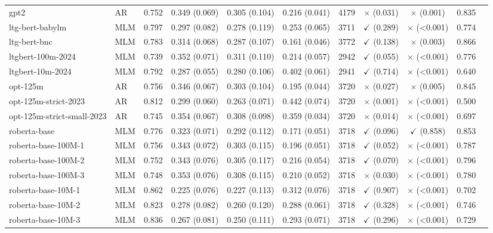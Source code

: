 \begin{table}[]
\begin{adjustbox}{max width=\textwidth}
\begin{tabular}{llccccccccc}
gpt2 & AR & 0.752 & 0.349 (0.069) & 0.305 (0.104) & 0.216 (0.041) & 4179 & $\times$ (0.031) & $\times$ (0.001) & 0.835 \\
ltg-bert-babylm & MLM & 0.797 & 0.297 (0.082) & 0.278 (0.119) & 0.253 (0.065) & 3711 & $\checkmark$ (0.289) & $\times$ (<0.001) & 0.774 \\
ltg-bert-bnc & MLM & 0.783 & 0.314 (0.068) & 0.287 (0.107) & 0.161 (0.046) & 3772 & $\checkmark$ (0.138) & $\times$ (0.003) & 0.866 \\
ltgbert-100m-2024 & MLM & 0.739 & 0.352 (0.071) & 0.311 (0.110) & 0.214 (0.057) & 2942 & $\checkmark$ (0.055) & $\times$ (<0.001) & 0.776 \\
ltgbert-10m-2024 & MLM & 0.792 & 0.287 (0.055) & 0.280 (0.106) & 0.402 (0.061) & 2941 & $\checkmark$ (0.714) & $\times$ (<0.001) & 0.640 \\
opt-125m & AR & 0.756 & 0.346 (0.067) & 0.303 (0.104) & 0.195 (0.044) & 3720 & $\times$ (0.027) & $\times$ (0.005) & 0.845 \\
opt-125m-strict-2023 & AR & 0.812 & 0.299 (0.060) & 0.263 (0.071) & 0.442 (0.074) & 3720 & $\times$ (0.001) & $\times$ (<0.001) & 0.500 \\
opt-125m-strict-small-2023 & AR & 0.745 & 0.354 (0.067) & 0.308 (0.098) & 0.359 (0.034) & 3720 & $\times$ (0.014) & $\times$ (<0.001) & 0.697 \\
roberta-base & MLM & 0.776 & 0.323 (0.071) & 0.292 (0.112) & 0.171 (0.051) & 3718 & $\checkmark$ (0.096) & $\checkmark$ (0.858) & 0.853 \\
roberta-base-100M-1 & MLM & 0.756 & 0.343 (0.072) & 0.303 (0.115) & 0.196 (0.051) & 3718 & $\checkmark$ (0.052) & $\times$ (<0.001) & 0.787 \\
roberta-base-100M-2 & MLM & 0.752 & 0.343 (0.076) & 0.305 (0.117) & 0.216 (0.054) & 3718 & $\checkmark$ (0.070) & $\times$ (<0.001) & 0.796 \\
roberta-base-100M-3 & MLM & 0.748 & 0.353 (0.076) & 0.308 (0.115) & 0.210 (0.052) & 3718 & $\times$ (0.030) & $\times$ (<0.001) & 0.780 \\
roberta-base-10M-1 & MLM & 0.862 & 0.225 (0.076) & 0.227 (0.113) & 0.312 (0.076) & 3718 & $\checkmark$ (0.907) & $\times$ (<0.001) & 0.702 \\
roberta-base-10M-2 & MLM & 0.823 & 0.278 (0.082) & 0.260 (0.120) & 0.288 (0.061) & 3718 & $\checkmark$ (0.328) & $\times$ (<0.001) & 0.746 \\
roberta-base-10M-3 & MLM & 0.836 & 0.267 (0.081) & 0.250 (0.111) & 0.293 (0.071) & 3718 & $\checkmark$ (0.296) & $\times$ (<0.001) & 0.729 \\

\end{tabular}
\end{adjustbox}
\end{table}
